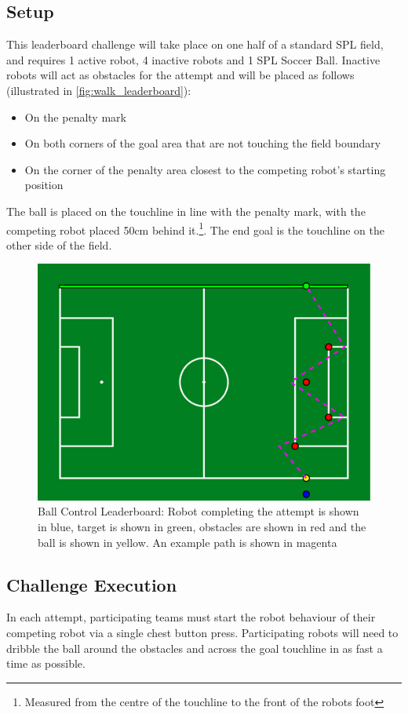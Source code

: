 \subsection{Setup}
This leaderboard challenge will take place on one half of a standard SPL field, and requires 1 active robot, 4 inactive robots and 1 SPL Soccer Ball.
Inactive robots will act as obstacles for the attempt and will be placed as follows (illustrated in \cref{fig:walk_leaderboard}):
\begin{itemize}
    \item On the penalty mark
    \item On both corners of the goal area that are not touching the field boundary
    \item On the corner of the penalty area closest to the competing robot's starting position
\end{itemize}
The ball is placed on the touchline in line with the penalty mark, with the competing
robot placed 50cm behind it.\footnote {Measured from the centre of the touchline to the front of the robots foot}.
The end goal is the touchline on the other side of the field.

\begin{figure}[t]
    \centerline{\includegraphics[width=\columnwidth]{figs/leaderboards/control_leaderboard.pdf}}
    \caption{Ball Control Leaderboard: Robot completing the attempt is shown in blue, target is shown in green, obstacles are shown in red and the ball is shown in yellow. An example path is shown in magenta}
    \label{fig:ball_control_leaderboard}
\end{figure}

\subsection{Challenge Execution}
In each attempt, participating teams must start the robot behaviour of their competing robot via a single chest button
press. Participating robots will need to dribble the ball around the obstacles and across
the goal touchline in as fast a time as possible.

